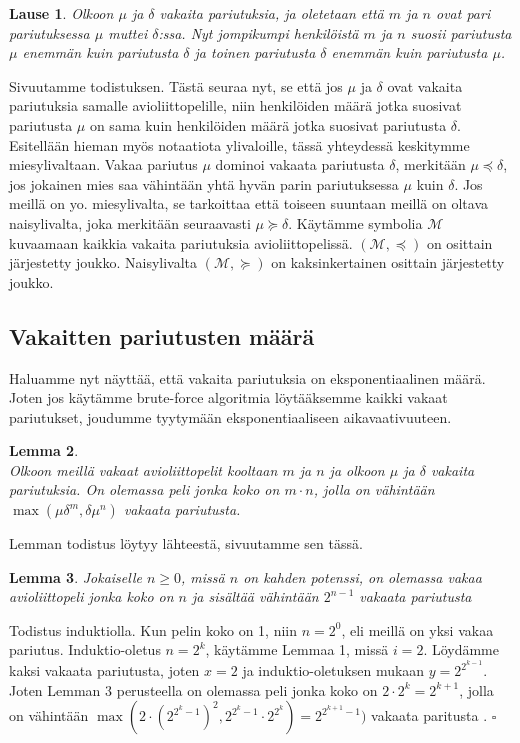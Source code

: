\documentclass[finnish]{tktltiki2}
\newtheorem{lau}{Lause}
\newtheorem{lem}[lau]{Lemma}
\theoremstyle{definition}
\theoremstyle{remark}
\begin{document}
\begin{lau} \cite[p. 18]{gusfield1989stable}
	Olkoon $\mu$ ja $\delta$ vakaita pariutuksia, ja oletetaan että $m$ ja $n$ ovat pari pariutuksessa $\mu$ muttei $\delta$:ssa. Nyt jompikumpi henkilöistä $m$ ja $n$ suosii pariutusta $\mu$ enemmän kuin pariutusta $\delta$ ja toinen pariutusta $\delta$ enemmän kuin pariutusta $\mu$.
\end{lau}
Sivuutamme todistuksen.
Tästä seuraa nyt, se että jos $\mu$ ja $\delta$ ovat vakaita pariutuksia samalle avioliittopelille, niin henkilöiden määrä jotka suosivat pariutusta $\mu$ on sama kuin henkilöiden määrä jotka suosivat pariutusta $\delta$.
Esitellään hieman myös notaatiota ylivaloille, tässä yhteydessä keskitymme miesylivaltaan.
Vakaa pariutus $\mu$ dominoi vakaata pariutusta $\delta$, merkitään $\mu \preceq \delta$, jos jokainen mies saa vähintään yhtä hyvän parin pariutuksessa $\mu$ kuin $\delta$.
Jos meillä on yo. miesylivalta, se tarkoittaa että toiseen suuntaan meillä on oltava naisylivalta, joka merkitään seuraavasti $\mu \succeq \delta$. Käytämme symbolia $\mathcal{M}$ kuvaamaan kaikkia vakaita pariutuksia avioliittopelissä. $(\mathcal{M}, \preceq)$ on osittain järjestetty joukko. Naisylivalta $(\mathcal{M}, \succeq)$ on kaksinkertainen osittain järjestetty joukko.

\subsection{Vakaitten pariutusten määrä}
Haluamme nyt näyttää, että vakaita pariutuksia on eksponentiaalinen määrä. Joten jos käytämme brute-force algoritmia löytääksemme kaikki vakaat pariutukset, joudumme tyytymään eksponentiaaliseen aikavaativuuteen.

\begin{lem} \cite[p. 23]{gusfield1989stable} \\
	Olkoon meillä vakaat avioliittopelit kooltaan $m$ ja $n$ ja olkoon $\mu$ ja $\delta$ vakaita pariutuksia. On olemassa peli jonka koko on $m \cdot n$, jolla on vähintään $\max(\mu\delta^m, \delta\mu^n)$ vakaata pariutusta.
\end{lem}
Lemman todistus löytyy lähteestä, sivuutamme sen tässä.

\begin{lem}
Jokaiselle $n \geq 0$, missä $n$ on kahden potenssi, on olemassa vakaa avioliittopeli jonka koko on $n$ ja sisältää vähintään $2^{n-1}$ vakaata pariutusta
\end{lem}
Todistus induktiolla. Kun pelin koko on 1, niin $n = 2^0$, eli meillä on yksi vakaa pariutus. Induktio-oletus $n = 2^k$, käytämme Lemmaa 1, missä $i = 2$. Löydämme kaksi vakaata pariutusta, joten $x = 2$ ja induktio-oletuksen mukaan $y = 2^{2^{k-1}}$. Joten Lemman 3 perusteella on olemassa peli jonka koko on $2 \cdot 2^k = 2^{k+1}$, jolla on vähintään $\max(2 \cdot (2^{2^{{k}}-1})^2, 2^{2^{k}-1} \cdot 2^{2^{k}}) = 2^{2^{k+1}-1})$ vakaata paritusta \cite[p. 24]{gusfield1989stable}. $\square$
\end{document}
